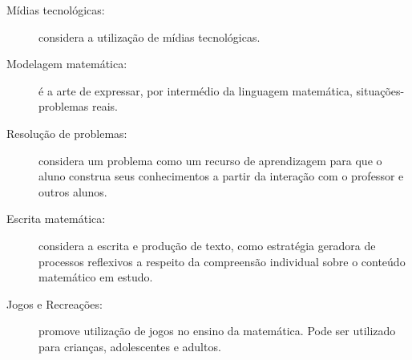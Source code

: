 \documentclass[a4paper, 12pt]{article}
\begin{document}
\begin{enumerate}
\begin{description}
  \item[Mídias tecnológicas:]  considera a utilização de mídias tecnológicas.
  \item[Modelagem matemática:] é a arte de expressar, por intermédio da linguagem matemática, situações-problemas reais.
  \item[Resolução de problemas:] considera um problema como um recurso de aprendizagem para que o aluno construa seus conhecimentos a partir da interação com o professor e outros alunos.
  \item[Escrita matemática:] considera a escrita e produção de texto, como estratégia geradora de processos reflexivos a respeito da compreensão individual sobre o conteúdo matemático em estudo.
    \item[Jogos e Recreações:] promove utilização de jogos no ensino da matemática. Pode ser utilizado para crianças, adolescentes e adultos. 
  \end{description}
 \end{enumerate}
\end{document}
